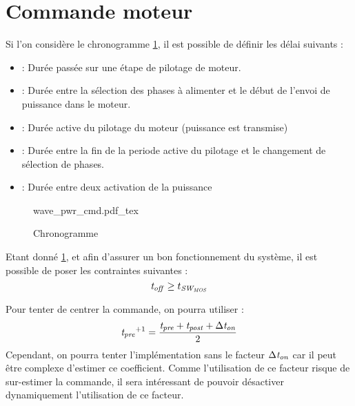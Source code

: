 \section{Commande moteur}
Si l'on considère le chronogramme \cref{fig:chrono_centered_motor}, il est possible de définir les délai suivants :
\begin{itemize}
    \item \tstep : Durée passée sur une étape de pilotage de moteur.
    \item \tpre : Durée entre la sélection des phases à alimenter et le début de l'envoi de puissance dans le moteur.
    \item \ton  : Durée active du pilotage du moteur (puissance est transmise)
    \item \tpost: Durée entre la fin de la periode active du pilotage et le changement de sélection de phases.
    \item \toff : Durée entre deux activation de la puissance
\end{itemize}

\begin{figure}[h]
    \def\svgwidth{17cm}
    {wave_pwr_cmd.pdf_tex}
    \caption{Chronogramme}
    \label{fig:chrono_centered_motor}
\end{figure}

Etant donné \cref{fig:chrono_centered_motor}, et afin d'assurer un bon fonctionnement du système, il est possible de poser les contraintes suivantes :
$$\mathit{t_{off}} \ge t_{\mathit{SW_{\mathit{MOS}}}}$$

Pour tenter de centrer la commande, on pourra utiliser :
$$\mathit{t_{pre}}^{+1} = \frac{\mathit{t_{pre}} + \mathit{t_{post}} + \Delta \mathit{t_{on}}}{2}$$
Cependant, on pourra tenter l'implémentation sans le facteur $\Delta\mathit{t_{on}}$ car il peut être complexe d'estimer ce coefficient.
Comme l'utilisation de ce facteur risque de sur-estimer la commande, il sera intéressant de pouvoir désactiver dynamiquement l'utilisation de ce facteur.